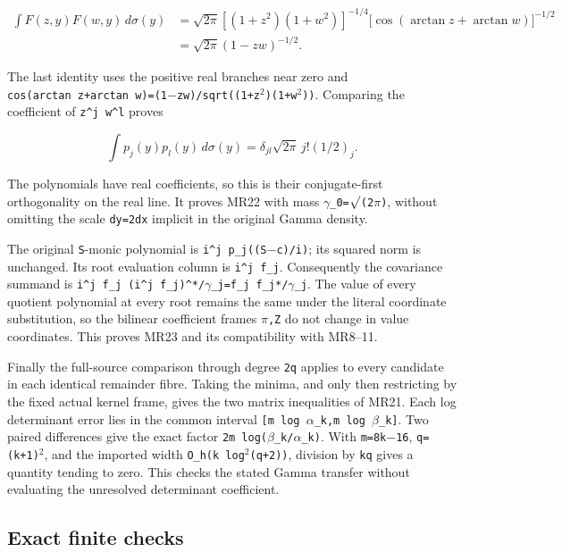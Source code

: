 \documentclass[11pt]{article}
\begin{document}
\[
\begin{aligned}
\int F(z,y)F(w,y)\,d\sigma(y)
&=\sqrt{2\pi}[(1+z^2)(1+w^2)]^{-1/4}
\bigl[\cos(\arctan z+\arctan w)\bigr]^{-1/2}\\
&=\sqrt{2\pi}(1-zw)^{-1/2}.
\end{aligned}
\]

The last identity uses the positive real branches near zero and \texttt{cos(arctan\ z+arctan\ w)=(1\ensuremath{-}zw)/sqrt((1+z\ensuremath{{}^2})(1+w\ensuremath{{}^2}))}. Comparing the coefficient of \texttt{z\^{}j\ w\^{}l} proves

\[
\int p_j(y)p_l(y)\,d\sigma(y)
=\delta_{jl}\sqrt{2\pi}\,j!(1/2)_j.
\]

The polynomials have real coefficients, so this is their conjugate-first orthogonality on the real line. It proves MR22 with mass \texttt{\ensuremath{\gamma}\_0=\ensuremath{\surd}(2\ensuremath{\pi})}, without omitting the scale \texttt{dy=2dx} implicit in the original Gamma density.

The original \texttt{S}-monic polynomial is \texttt{i\^{}j\ p\_j((S\ensuremath{-}c)/i)}; its squared norm is unchanged. Its root evaluation column is \texttt{i\^{}j\ f\_j}. Consequently the covariance summand is \texttt{i\^{}j\ f\_j\ (i\^{}j\ f\_j)\^{}*/\ensuremath{\gamma}\_j=f\_j\ f\_j*/\ensuremath{\gamma}\_j}. The value of every quotient polynomial at every root remains the same under the literal coordinate substitution, so the bilinear coefficient frames \texttt{\ensuremath{\pi},Z} do not change in value coordinates. This proves MR23 and its compatibility with MR8--11.

Finally the full-source comparison through degree \texttt{2q} applies to every candidate in each identical remainder fibre. Taking the minima, and only then restricting by the fixed actual kernel frame, gives the two matrix inequalities of MR21. Each log determinant error lies in the common interval \texttt{{[}m\ log\ \ensuremath{\alpha}\_k,m\ log\ \ensuremath{\beta}\_k{]}}. Two paired differences give the exact factor \texttt{2m\ log(\ensuremath{\beta}\_k/\ensuremath{\alpha}\_k)}. With \texttt{m=8k\ensuremath{-}16}, \texttt{q=(k+1)\ensuremath{{}^2}}, and the imported width \texttt{O\_h(k\ log\ensuremath{{}^2}(q+2))}, division by \texttt{kq} gives a quantity tending to zero. This checks the stated Gamma transfer without evaluating the unresolved determinant coefficient.

\subsection{Exact finite checks}\label{mrreview:exact-finite-checks}
\end{document}
